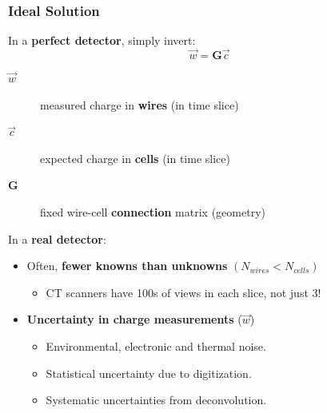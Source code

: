 \begin{frame}
  \frametitle{Ideal Solution}

  In a \textbf{perfect detector}, simply invert:
  \[\vec{w} = \mathbf{G} \vec{c}\]

  \begin{description}
  \item[$\vec{w}$] measured charge in \textbf{wires} (in time slice)
  \item[$\vec{c}$] expected charge in \textbf{cells} (in time slice)
  \item[$\mathbf{G}$] fixed wire-cell \textbf{connection} matrix (geometry)
  \end{description}

  In a \textbf{real detector}:

  \begin{itemize}
  \item Often, \textbf{fewer knowns than unknowns} $(N_{wires} < N_{cells})$
    \begin{itemize}\footnotesize
    \item CT scanners have 100s of views in each slice, not just 3!
    \end{itemize}
  \item \textbf{Uncertainty in charge measurements} ($\vec{w}$)
    \begin{itemize}\footnotesize
    \item Environmental, electronic and thermal noise.
    \item Statistical uncertainty due to digitization.
    \item Systematic uncertainties from deconvolution.
    \end{itemize}
  \end{itemize}

\end{frame}


